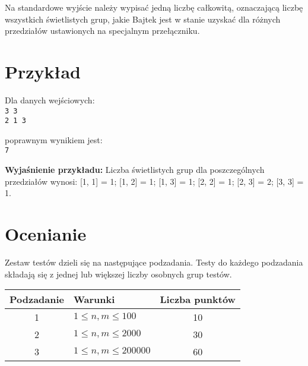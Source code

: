 \documentclass[10pt]{article}
\begin{document}
    Na standardowe wyjście należy wypisać jedną liczbę całkowitą, oznaczającą liczbę wszystkich świetlistych grup, jakie Bajtek jest w stanie uzyskać dla różnych przedziałów ustawionych na specjalnym przełączniku.  


    \section*{Przykład}
    
    \noindent
    \begin{minipage}[t]{0.5\textwidth}
        Dla danych wejściowych:\vspace{1ex}\\
        \texttt{3 3\\2 1 3}
    \end{minipage}
    \begin{minipage}[t]{0.5\textwidth}
        poprawnym wynikiem jest:\vspace{1ex}\\
        \texttt{7}
    \end{minipage}
    
    \vspace{2ex}
    \noindent\textbf{Wyjaśnienie przykładu:} Liczba świetlistych grup dla poszczególnych przedziałów wynosi: [1, 1] = 1; [1, 2] = 1; [1, 3] = 1; [2, 2] = 1; [2, 3] = 2; [3, 3] = 1. 
    

    \section*{Ocenianie}
        
    Zestaw testów dzieli się na następujące podzadania. Testy do każdego podzadania składają się z jednej lub większej liczby osobnych grup testów.
    
    \begin{center}
        \begin{tabular}{ |c|p{9cm}|c| }
            \hline
            \textbf{Podzadanie} & \textbf{Warunki} & \textbf{Liczba punktów}\\
            \hline
            1 & $1 \leq n, m \leq 100$ & 10\\
            \hline
            2 & $1 \leq n, m \leq 2000$ & 30\\
            \hline
            3 & $1 \leq n, m \leq 200000$ & 60\\
            \hline
            
        \end{tabular}
    \end{center}
\end{document}
